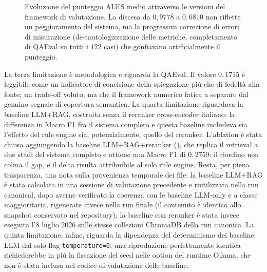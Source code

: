 \begin{figure}[t]
  \centering
  \caption{Evoluzione del punteggio ALES medio attraverso le versioni del framework di valutazione. La discesa da $0{,}9778$ a $0{,}6810$ non riflette un peggioramento del sistema, ma la progressiva correzione di errori di misurazione (de-tautologizzazione delle metriche, completamento di QAEval su tutti i $122$ casi) che gonfiavano artificialmente il punteggio.}
  \label{fig:ales-evol}
\end{figure}

La terza limitazione è metodologica e riguarda la QAEval. Il valore $0{,}1715$ è leggibile come un indicatore di concisione della spiegazione più che di fedeltà alla fonte; un trade-off voluto, ma che il framework numerico fatica a separare dal genuino segnale di copertura semantica. La quarta limitazione riguardava la baseline LLM+RAG, costruita senza il reranker cross-encoder italiano: la differenza in Macro F1 fra il sistema completo e questa baseline includeva sia l'effetto del rule engine sia, potenzialmente, quello del reranker. L'ablation è stata chiusa aggiungendo la baseline LLM+RAG+reranker (), che replica il retrieval a due stadi del sistema completo e ottiene una Macro F1 di $0{,}2759$: il riordino non colma il gap, e il delta risulta attribuibile al solo rule engine. Resta, per piena trasparenza, una nota sulla provenienza temporale dei file: la baseline LLM+RAG è stata calcolata in una sessione di valutazione precedente e riutilizzata nella run canonical, dopo averne verificato la coerenza con le baseline LLM-only e a classe maggioritaria, rigenerate invece nella run finale (il contenuto è identico allo snapshot conservato nel repository); la baseline con reranker è stata invece eseguita l'8 luglio 2026 sulle stesse collezioni ChromaDB della run canonica. La quinta limitazione, infine, riguarda la dipendenza del determinismo dei baseline LLM dal solo flag \texttt{temperature=0}: una riproduzione perfettamente identica richiederebbe in più la fissazione del seed nelle option del runtime Ollama, che non è stata inclusa nel codice di valutazione delle baseline.

